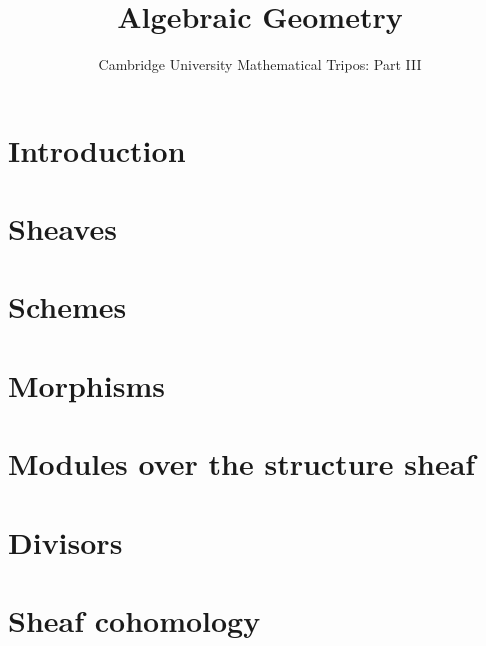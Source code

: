 \documentclass{article}
\title{Algebraic Geometry}
\author{Cambridge University Mathematical Tripos: Part III}
\begin{document}
\maketitle

\tableofcontentsnewpage{}


\section{Introduction}

\section{Sheaves}

\section{Schemes}

\section{Morphisms}

\section{Modules over the structure sheaf}

\section{Divisors}

\section{Sheaf cohomology}

\end{document}

